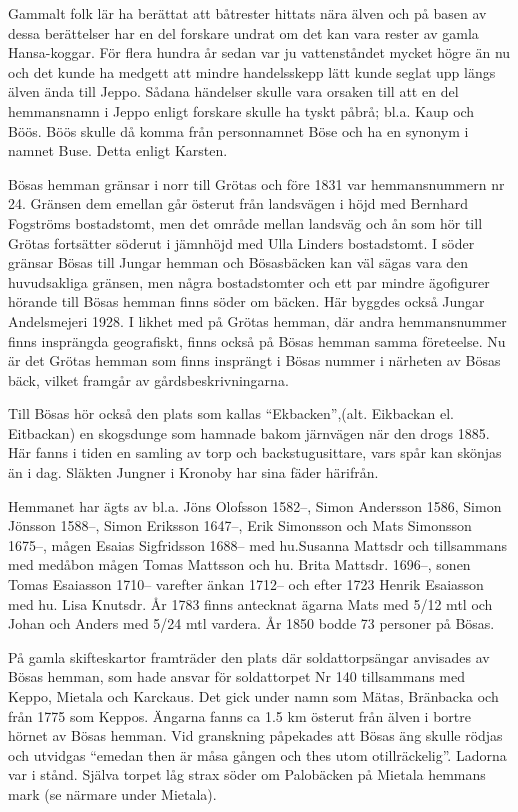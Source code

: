 


Gammalt folk lär ha berättat att båtrester hittats nära älven och på basen av dessa berättelser har en del forskare undrat om det kan vara rester av gamla Hansa-koggar. För flera hundra år sedan var ju vattenståndet mycket högre än nu och det kunde ha medgett att mindre handelsskepp lätt kunde seglat upp längs älven ända till Jeppo. Sådana händelser skulle vara orsaken till att en del hemmansnamn i Jeppo enligt forskare skulle ha tyskt påbrå; bl.a. Kaup och Böös. Böös skulle då komma från personnamnet Böse och ha en synonym i namnet Buse. Detta enligt Karsten.

Bösas hemman gränsar i norr till Grötas och före 1831 var hemmansnummern nr 24. Gränsen dem emellan går österut från landsvägen i höjd med Bernhard Fogströms bostadstomt, men det område mellan landsväg  och ån som hör till Grötas fortsätter söderut i jämnhöjd med Ulla Linders bostadstomt. I söder gränsar Bösas till Jungar hemman och Bösasbäcken kan väl sägas vara den huvudsakliga gränsen, men några bostadstomter och ett par mindre ägofigurer hörande till Bösas hemman finns söder om bäcken. Här byggdes också Jungar Andelsmejeri 1928. I likhet med på Grötas hemman, där andra hemmansnummer finns insprängda geografiskt, finns också på Bösas hemman samma företeelse. Nu är det Grötas hemman som finns insprängt i Bösas nummer i närheten av Bösas bäck, vilket framgår av gårdsbeskrivningarna.

Till Bösas hör också den plats som kallas ``Ekbacken'',(alt. Eikbackan el. Eitbackan) en skogsdunge som hamnade bakom järnvägen när den drogs 1885. Här fanns i tiden en samling av torp och backstugusittare, vars spår kan skönjas än i dag. Släkten Jungner i Kronoby har sina fäder härifrån.

Hemmanet har ägts av bl.a. Jöns Olofsson 1582--, Simon Andersson 1586, Simon Jönsson 1588--, Simon Eriksson 1647--, Erik Simonsson och Mats Simonsson 1675--,  mågen Esaias Sigfridsson 1688-- med hu.Susanna Mattsdr och tillsammans med medåbon mågen Tomas Mattsson och hu. Brita Mattsdr. 1696--, sonen Tomas Esaiasson 1710-- varefter änkan 1712-- och efter 1723 Henrik Esaiasson med hu. Lisa Knutsdr. År 1783 finns antecknat ägarna Mats med 5/12 mtl och Johan och Anders med 5/24 mtl vardera. År 1850 bodde 73 personer på Bösas.

På gamla skifteskartor framträder den plats där soldattorpsängar anvisades av Bösas hemman, som hade ansvar för soldattorpet Nr 140 tillsammans med Keppo, Mietala och Karckaus. Det gick under namn som Mätas, Bränbacka och från 1775 som Keppos. Ängarna fanns ca 1.5 km österut från älven i bortre hörnet av Bösas hemman. Vid granskning påpekades att Bösas äng skulle rödjas och utvidgas ``emedan then är måsa gången och thes utom otillräckelig''. Ladorna var i stånd. Själva torpet låg strax söder om Palobäcken på Mietala hemmans mark (se närmare under Mietala).

